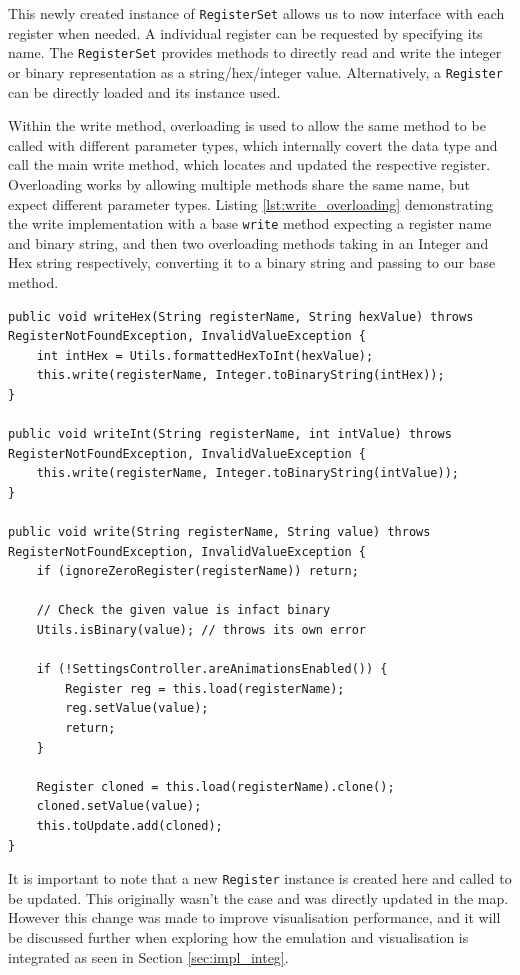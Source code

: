 This newly created instance of \texttt{RegisterSet} allows us to now interface with each register when needed. A individual register can be requested by specifying its name. The \texttt{RegisterSet} provides methods to directly read and write the integer or binary representation as a string/hex/integer value. Alternatively, a \texttt{Register} can be directly loaded and its instance used.

Within the write method, overloading is used to allow the same method to be called with different parameter types, which internally covert the data type and call the main write method, which locates and updated the respective register. Overloading works by allowing multiple methods share the same name, but expect different parameter types. Listing \ref{lst:write_overloading} demonstrating the write implementation with a base \texttt{write} method expecting a register name and binary string, and then two overloading methods taking in an Integer and Hex string respectively, converting it to a binary string and passing to our base method.

\begin{lstlisting}[caption=Write overloading, label=lst:write_overloading]
public void writeHex(String registerName, String hexValue) throws RegisterNotFoundException, InvalidValueException {
    int intHex = Utils.formattedHexToInt(hexValue);
    this.write(registerName, Integer.toBinaryString(intHex));
}

public void writeInt(String registerName, int intValue) throws RegisterNotFoundException, InvalidValueException {
    this.write(registerName, Integer.toBinaryString(intValue));
}

public void write(String registerName, String value) throws RegisterNotFoundException, InvalidValueException {
    if (ignoreZeroRegister(registerName)) return;

    // Check the given value is infact binary
    Utils.isBinary(value); // throws its own error

    if (!SettingsController.areAnimationsEnabled()) {
        Register reg = this.load(registerName);
        reg.setValue(value);
        return;
    }

    Register cloned = this.load(registerName).clone();
    cloned.setValue(value);
    this.toUpdate.add(cloned);
}
\end{lstlisting}

It is important to note that a new \texttt{Register} instance is created here and called to be updated. This originally wasn't the case and was directly updated in the map. However this change was made to improve visualisation performance, and it will be discussed further when exploring how the emulation and visualisation is integrated as seen in Section \ref{sec:impl_integ}.

